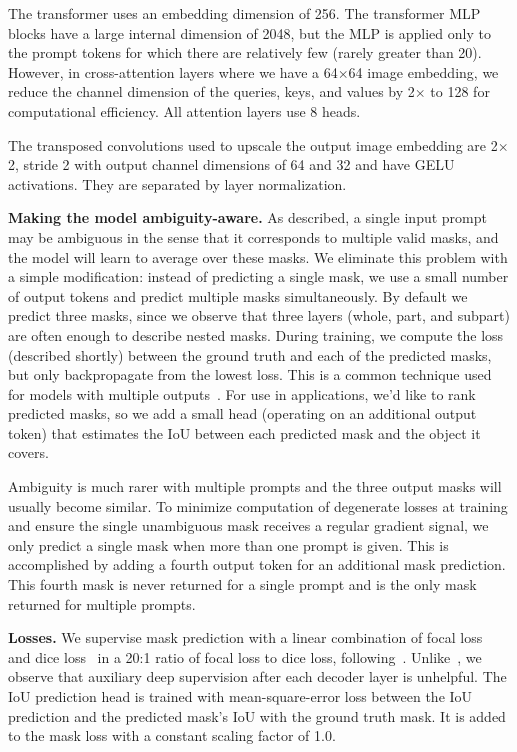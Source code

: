 \documentclass[10pt,twocolumn,letterpaper]{article}
\renewcommand{\paragraph}[1]{\vspace{1.25mm}\noindent\textbf{#1}}
\newcommand{\x}{{\times}}
\begin{document}
The transformer uses an embedding dimension of 256. The transformer MLP blocks have a large internal dimension of 2048, but the MLP is applied only to the prompt tokens for which there are relatively few (rarely greater than 20). However, in cross-attention layers where we have a 64$\x$64 image embedding, we reduce the channel dimension of the queries, keys, and values by 2$\x$ to 128 for computational efficiency. All attention layers use 8 heads.

The transposed convolutions used to upscale the output image embedding are 2$\x$2, stride 2 with output channel dimensions of 64 and 32 and have GELU activations. They are separated by layer normalization.

\paragraph{Making the model ambiguity-aware.} As described, a single input prompt may be ambiguous in the sense that it corresponds to multiple valid masks, and the model will learn to average over these masks. We eliminate this problem with a simple modification: instead of predicting a single mask, we use a small number of output tokens and predict multiple masks simultaneously. By default we predict three masks, since we observe that three layers (whole, part, and subpart) are often enough to describe nested masks. During training, we compute the loss (described shortly) between the ground truth and each of the predicted masks, but only backpropagate from the lowest loss. This is a common technique used for models with multiple outputs~\cite{charpiat2008automatic,guzman2012multiple,li2018interactive}. For use in applications, we'd like to rank predicted masks, so we add a small head (operating on an additional output token) that estimates the IoU between each predicted mask and the object it covers.

Ambiguity is much rarer with multiple prompts and the three output masks will usually become similar. To minimize computation of degenerate losses at training and ensure the single unambiguous mask receives a regular gradient signal, we only predict a single mask when more than one prompt is given. This is accomplished by adding a fourth output token for an additional mask prediction. This fourth mask is never returned for a single prompt and is the only mask returned for multiple prompts.

\paragraph{Losses.} We supervise mask prediction with a linear combination of focal loss~\cite{Lin2017a} and dice loss~\cite{milletari2016v} in a 20:1 ratio of focal loss to dice loss, following~\cite{cheng2021per,Carion2020}. Unlike~\cite{cheng2021per,Carion2020}, we observe that auxiliary deep supervision after each decoder layer is unhelpful. The IoU prediction head is trained with mean-square-error loss between the IoU prediction and the predicted mask's IoU with the ground truth mask. It is added to the mask loss with a constant scaling factor of 1.0.
\end{document}
